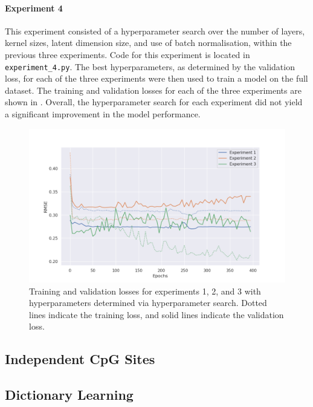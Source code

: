 \documentclass[twocolumn, 9pt]{extarticle}
\begin{document}
\paragraph{Experiment 4} This experiment consisted of a hyperparameter search over the number of layers, kernel sizes, latent dimension size, and use of batch normalisation, within the previous three experiments. Code for this experiment is located in \texttt{experiment\_4.py}. The best hyperparameters, as determined by the validation loss, for each of the three experiments were then used to train a model on the full dataset. The training and validation losses for each of the three experiments are shown in . Overall, the hyperparameter search for each experiment did not yield a significant improvement in the model performance.

\begin{figure}
  \centering
  \includegraphics[width=\columnwidth]{plot_experiments_4.png}
  \caption{Training and validation losses for experiments 1, 2, and 3 with hyperparameters determined via hyperparameter search. Dotted lines indicate the training loss, and solid lines indicate the validation loss.}
  \label{fig:losses_hparams}
\end{figure}

\subsection{Independent CpG Sites}

\subsection{Dictionary Learning}



\end{document}
